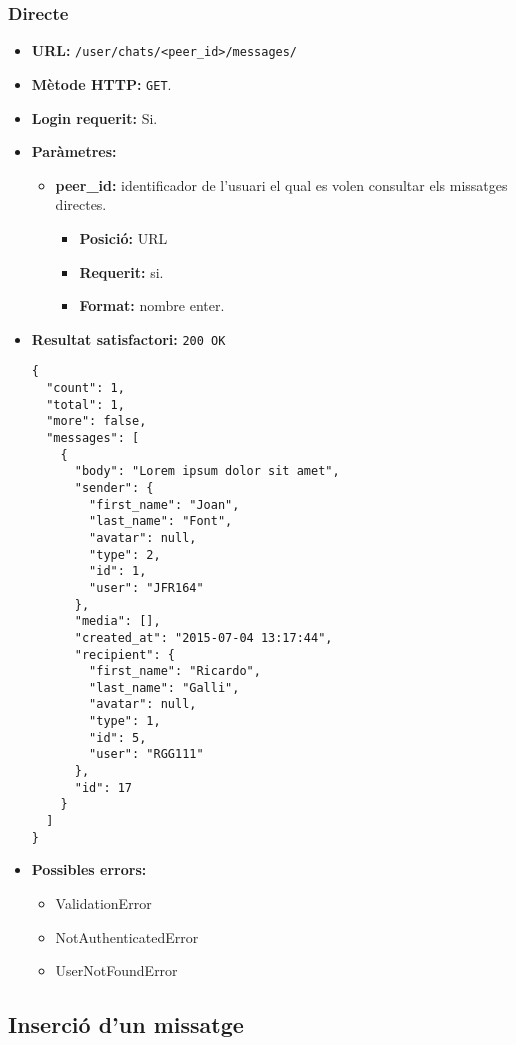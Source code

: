 	\subsubsection{Directe}
	\begin{itemize}
	\item \textbf{\ac{URL}:} \texttt{/user/chats/<peer\_id>/messages/}
	\item \textbf{Mètode \ac{HTTP}: } \texttt{GET}.
	\item \textbf{Login requerit:} Si.
	\item \textbf{Paràmetres:}
	\begin{itemize}
		\item \textbf{peer\_id:} identificador de l'usuari el qual es volen consultar els missatges directes.
		\begin{itemize}
			\item \textbf{Posició:} \ac{URL}
			\item \textbf{Requerit:} si.
			\item \textbf{Format:} nombre enter.
		\end{itemize}
	\end{itemize}
		\item \textbf{Resultat satisfactori:} \texttt{200 OK}
	\begin{verbatim}
{
  "count": 1,
  "total": 1,
  "more": false,
  "messages": [
    {
      "body": "Lorem ipsum dolor sit amet",
      "sender": {
        "first_name": "Joan",
        "last_name": "Font",
        "avatar": null,
        "type": 2,
        "id": 1,
        "user": "JFR164"
      },
      "media": [],
      "created_at": "2015-07-04 13:17:44",
      "recipient": {
        "first_name": "Ricardo",
        "last_name": "Galli",
        "avatar": null,
        "type": 1,
        "id": 5,
        "user": "RGG111"
      },
      "id": 17
    }
  ]
}
	\end{verbatim}
	\item \textbf{Possibles errors:}
	\begin{itemize}
		\item ValidationError
		\item NotAuthenticatedError
		\item UserNotFoundError
	\end{itemize}
	\end{itemize}


\subsection{Inserció d'un missatge}

